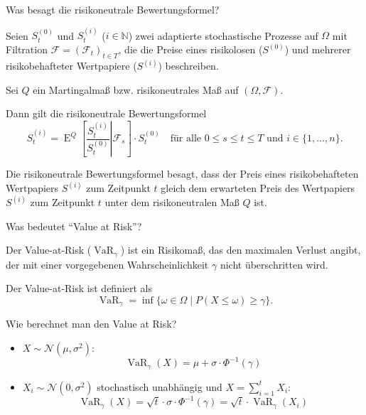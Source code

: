 \begin{QandA}
    \item Was besagt die risikoneutrale Bewertungsformel?
    \begin{answered}
        Seien $S^{(0)}_{t}$ und $S^{(i)}_{t}$ ($i \in \mathbb{N}$) zwei adaptierte stochastische Prozesse auf $\Omega$ mit Filtration $\mathcal{F} =({\mathcal{F}}_{t})_{t\in T}$, die die Preise eines risikolosen ($S^{(0)}$) und mehrerer risikobehafteter Wertpapiere ($S^{(i)}$) beschreiben.

        Sei $Q$ ein Martingalmaß bzw. risikoneutrales Maß auf $(\Omega, \mathcal{F})$.

        Dann gilt die risikoneutrale Bewertungsformel
        \[
            S^{(i)}_{t} = \operatorname{E}^{Q}\left[\left.\frac{S^{(i)}_{t}}{S^{(0)}_{t}} \right| \mathcal{F}_{s}\right] \cdot S^{(0)}_{t} \quad \text{für alle } 0 \leq s \leq t \leq T \text{ und } i \in \{1, \ldots, n\}.
        \]

        Die risikoneutrale Bewertungsformel besagt, dass der Preis eines risikobehafteten Wertpapiers $S^{(i)}$ zum Zeitpunkt $t$ gleich dem erwarteten Preis des Wertpapiers $S^{(i)}$ zum Zeitpunkt $t$ unter dem risikoneutralen Maß $Q$ ist.
    \end{answered}

    \item Was bedeutet \enquote{Value at Risk}?
    \begin{answered}
        Der Value-at-Risk ($\operatorname{VaR}_\gamma$) ist ein Risikomaß, das den maximalen Verlust angibt, der mit einer vorgegebenen Wahrscheinlichkeit $\gamma$ nicht überschritten wird.

        Der Value-at-Risk ist definiert als
        \[
            \operatorname{VaR}_\gamma = \inf \{ \omega \in \Omega \mid P(X \leq \omega) \geq \gamma \}.
        \]
    \end{answered}

    \item Wie berechnet man den Value at Risk?
    \begin{answered}
        \begin{itemize}
            \item $X \sim \mathcal{N}(\mu, \sigma^2)$:
                  \begin{equation}
                      \tag{Wurzelformel}
                      \operatorname{VaR}_\gamma(X) = \mu + \sigma \cdot \Phi^{-1}(\gamma)
                  \end{equation}
            \item $X_i \sim \mathcal{N}(0, \sigma^2)$ stochastisch unabhängig und $X = \sum_{i=1}^t X_i$:
                  \begin{equation}
                      \tag{Standardformel}
                      \operatorname{VaR}_\gamma(X) = \sqrt{t} \cdot \sigma \cdot \Phi^{-1}(\gamma) = \sqrt{t} \cdot \operatorname{VaR}_\gamma(X_i)
                  \end{equation}
        \end{itemize}
    \end{answered}
\end{QandA}



